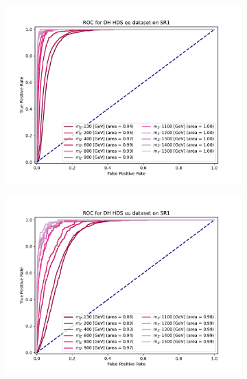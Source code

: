 \documentclass[12pt, a4paper]{book}
\begin{document}
\begin{figure}[!ht]
\begin{subfigure}[b]{0.49\textwidth}
   \end{subfigure}
   \hfill
   \begin{subfigure}[b]{0.49\textwidth}
      \centering
      \includegraphics[width=1\textwidth]{XGBoost/Model_independent/50-100/DH_HDS/ROC_ee.pdf}
   \end{subfigure}
   \hfill
   \begin{subfigure}[b]{0.49\textwidth}
      \centering
      \includegraphics[width=1\textwidth]{XGBoost/Model_independent/50-100/DH_HDS/ROC_uu.pdf}
   \end{subfigure}
   \hfill
	\begin{subfigure}[b]{0.49\textwidth}
      \centering

\end{subfigure}
\end{figure}
\end{document}
